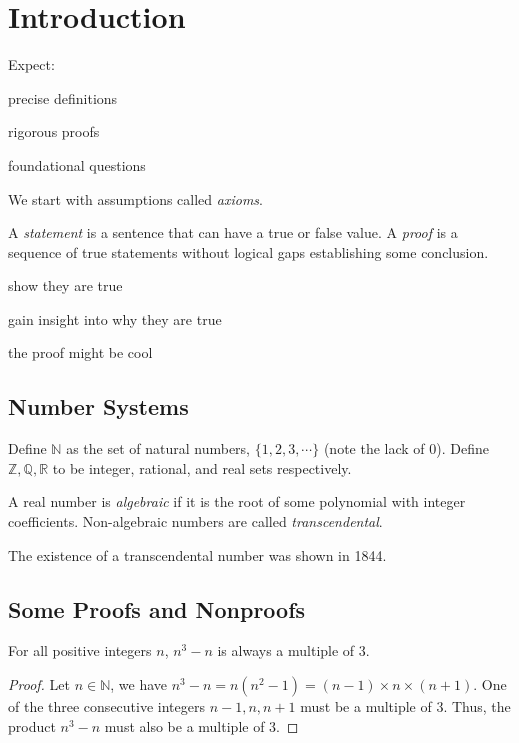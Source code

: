 \documentclass[12pt]{article}
\begin{document}

\section{Introduction}

Expect:
\begin{compactitem}
    \item precise definitions
    \item rigorous proofs
    \item foundational questions
\end{compactitem}

We start with assumptions called \emph{axioms}.

A \emph{statement} is a sentence that can have a true or false value.
A \emph{proof} is a sequence of true statements without logical gaps
establishing some conclusion.

\begin{compactitem}
\item show they are true
\item gain insight into why they are true
\item the proof might be cool
\end{compactitem}

\subsection{Number Systems}

Define $\mathbb{N}$ as the set of natural numbers, $\{1,2,3,\cdots\}$ (note the lack of $0$).
Define $\mathbb{Z},\mathbb{Q},\mathbb{R}$ to be 
integer, rational, and real sets respectively.

A real number is \emph{algebraic} if it is the
root of some polynomial with integer coefficients.
Non-algebraic numbers are called \emph{transcendental}.

The existence of a transcendental number was shown in 1844.

\subsection{Some Proofs and Nonproofs}

\begin{claim}
    For all positive integers $n$, $n^{3} - n$ is always a multiple of $3$.
\end{claim}
\begin{proof}
    Let $n \in \mathbb{N}$, we have $n^{3} - n = n(n^{2} - 1) = (n - 1) \times n \times (n+1)$.
    One of the three consecutive integers $n-1,n,n+1$ must be a multiple of $3$.
    Thus, the product $n^{3} - n$ must also be a multiple of $3$.
\end{proof}
\end{document}
